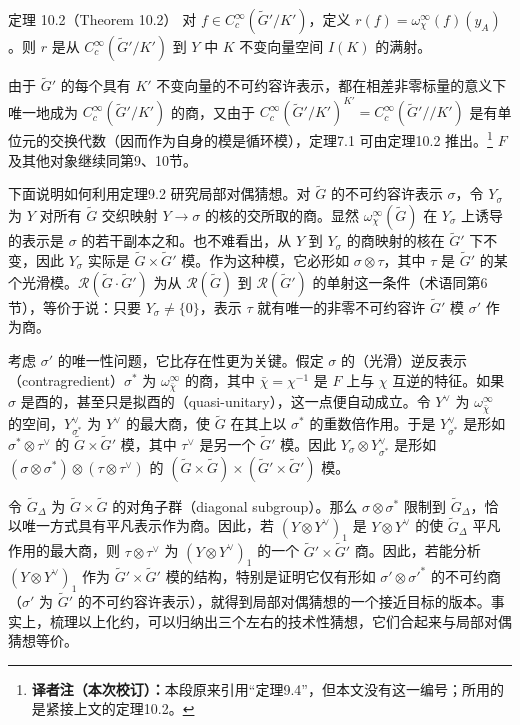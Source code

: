 \begin{originaltheorem}{定理 10.2（Theorem 10.2）}
对 $f\in C_c^\infty(\widetilde G'/K')$，定义 $r(f)=\omega_\chi^\infty(f)(y_A)$。则 $r$ 是从 $C_c^\infty(\widetilde G'/K')$ 到 $Y$ 中 $K$ 不变向量空间 $I(K)$ 的满射。
\end{originaltheorem}
由于 $\widetilde G'$ 的每个具有 $K'$ 不变向量的不可约容许表示，都在相差非零标量的意义下唯一地成为 $C_c^\infty(\widetilde G'/K')$ 的商，又由于 $C_c^\infty(\widetilde G'/K')^{K'}=C_c^\infty(\widetilde G'//K')$ 是有单位元的交换代数（因而作为自身的模是循环模），定理7.1 可由定理10.2 推出。\footnote{\textbf{译者注（本次校订）：}本段原来引用“定理9.4”，但本文没有这一编号；所用的是紧接上文的定理10.2。}
$F$ 及其他对象继续同第9、10节。

下面说明如何利用定理9.2 研究局部对偶猜想。对 $\widetilde G$ 的不可约容许表示 $\sigma$，令 $Y_\sigma$ 为 $Y$ 对所有 $\widetilde G$ 交织映射 $Y\to\sigma$ 的核的交所取的商。显然 $\omega_\chi^\infty(\widetilde G)$ 在 $Y_\sigma$ 上诱导的表示是 $\sigma$ 的若干副本之和。也不难看出，从 $Y$ 到 $Y_\sigma$ 的商映射的核在 $\widetilde G'$ 下不变，因此 $Y_\sigma$ 实际是 $\widetilde G\times\widetilde G'$ 模。作为这种模，它必形如 $\sigma\otimes\tau$，其中 $\tau$ 是 $\widetilde G'$ 的某个光滑模。$\mathcal R(\widetilde G\cdot\widetilde G')$ 为从 $\mathcal R(\widetilde G)$ 到 $\mathcal R(\widetilde G')$ 的单射这一条件（术语同第6节），等价于说：只要 $Y_\sigma\ne\{0\}$，表示 $\tau$ 就有唯一的非零不可约容许 $\widetilde G'$ 模 $\sigma'$ 作为商。

考虑 $\sigma'$ 的唯一性问题，它比存在性更为关键。假定 $\sigma$ 的（光滑）逆反表示（contragredient）$\sigma^*$ 为 $\omega_{\bar\chi}^\infty$ 的商，其中 $\bar\chi=\chi^{-1}$ 是 $F$ 上与 $\chi$ 互逆的特征。如果 $\sigma$ 是酉的，甚至只是拟酉的（quasi-unitary），这一点便自动成立。令 $Y^\vee$ 为 $\omega_{\bar\chi}^\infty$ 的空间，$Y_{\sigma^*}^\vee$ 为 $Y^\vee$ 的最大商，使 $\widetilde G$ 在其上以 $\sigma^*$ 的重数倍作用。于是 $Y_{\sigma^*}^\vee$ 是形如 $\sigma^*\otimes\tau^\vee$ 的 $\widetilde G\times\widetilde G'$ 模，其中 $\tau^\vee$ 是另一个 $\widetilde G'$ 模。因此 $Y_\sigma\otimes Y_{\sigma^*}^\vee$ 是形如 $(\sigma\otimes\sigma^*)\otimes(\tau\otimes\tau^\vee)$ 的 $(\widetilde G\times\widetilde G)\times(\widetilde G'\times\widetilde G')$ 模。

令 $\widetilde G_\Delta$ 为 $\widetilde G\times\widetilde G$ 的对角子群（diagonal subgroup）。那么 $\sigma\otimes\sigma^*$ 限制到 $\widetilde G_\Delta$，恰以唯一方式具有平凡表示作为商。因此，若 $(Y\otimes Y^\vee)_1$ 是 $Y\otimes Y^\vee$ 的使 $\widetilde G_\Delta$ 平凡作用的最大商，则 $\tau\otimes\tau^\vee$ 为 $(Y\otimes Y^\vee)_1$ 的一个 $\widetilde G'\times\widetilde G'$ 商。因此，若能分析 $(Y\otimes Y^\vee)_1$ 作为 $\widetilde G'\times\widetilde G'$ 模的结构，特别是证明它仅有形如 $\sigma'\otimes\sigma'^*$ 的不可约商（$\sigma'$ 为 $\widetilde G'$ 的不可约容许表示），就得到局部对偶猜想的一个接近目标的版本。事实上，梳理以上化约，可以归纳出三个左右的技术性猜想，它们合起来与局部对偶猜想等价。

